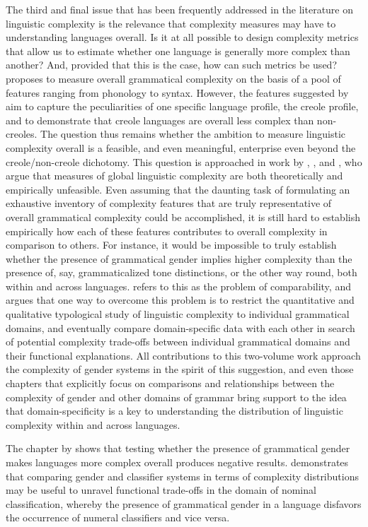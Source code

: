 \documentclass[output=collectionpaper]{langsci/langscibook}
\begin{document}
The third and final issue that has been frequently addressed in the literature on linguistic complexity is the relevance that complexity measures may have to understanding languages overall. Is it at all possible to design complexity metrics that allow us to estimate whether one language is generally more complex than another? And, provided that this is the case, how can such metrics be used? \citet{McWhorter2001} proposes to measure overall grammatical complexity on the basis of a pool of features ranging from phonology to syntax. However, the features suggested by \citet{McWhorter2001} aim to capture the peculiarities of one specific language profile, the creole profile, and to demonstrate that creole languages are overall less complex than non-creoles. The question thus remains whether the ambition to measure linguistic complexity overall is a feasible, and even meaningful, enterprise even beyond the creole/non-creole dichotomy. This question is approached in work by \citet{Miestamo2008}, \citet{Nichols2009}, and \citet{Sinnemaeki2014}, who argue that measures of global linguistic complexity are both theoretically and empirically unfeasible. Even assuming that the daunting task of formulating an exhaustive inventory of complexity features that are truly representative of overall grammatical complexity could be accomplished, it is still hard to establish empirically how each of these features contributes to overall complexity in comparison to others. For instance, it would be impossible to truly establish whether the presence of grammatical gender implies higher complexity than the presence of, say, grammaticalized tone distinctions, or the other way round, both within and across languages. \citet{Miestamo2008} refers to this as the problem of comparability, and argues that one way to overcome this problem is to restrict the quantitative and qualitative typological study of linguistic complexity to individual grammatical domains, and eventually compare domain-specific data with each other in search of potential complexity trade-offs between individual grammatical domains and their functional explanations. All contributions to this two-volume work approach the complexity of gender systems in the spirit of this suggestion, and even those chapters that explicitly focus on comparisons and relationships between the complexity of gender and other domains of grammar bring support to the idea that domain-specificity is a key to understanding the distribution of linguistic complexity within and across languages.

The chapter by  shows that testing whether the presence of grammatical gender makes languages more complex overall produces negative results.  demonstrates that comparing gender and classifier systems in terms of complexity distributions may be useful to unravel functional trade-offs in the domain of nominal classification, whereby the presence of grammatical gender in a language disfavors the occurrence of numeral classifiers and vice versa.
\end{document}
